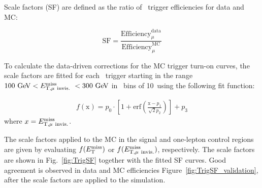 \par Scale factors (SF) are defined as the ratio of \MET~trigger efficiencies for data and MC:

\begin{equation}
	\label{eq:dataMCsf}
	\text{SF} = \frac{\text{Efficiency}^{\text{data}}_{\mu}}{\text{Efficiency}^{\text{MC}}_{\mu}}
\end{equation}

To calculate the data-driven corrections for the MC trigger turn-on curves, the scale factors are fitted for each \MET~trigger starting in the range $100~\text{Ge\kern -0.1em V} < E_{\mathrm{T, \mu~invis.}}^{\mathrm{miss}}~< 300~\text{Ge\kern -0.1em V}$ in \MET~bins of 10~\GeV using the following fit function:

\begin{eqnarray}
	\label{eq:dataMCsf_fit}
	f\left(\text{x}\right) = p_0 \cdot \left[1 + \text{erf}\left(\frac{\text{x} - p_{1}}{\sqrt{2}p_{2}}\right)\right] + p_3
\end{eqnarray}
where $x = E_{\mathrm{T, \mu~invis.}}^{\mathrm{miss}}$.

\par The scale factors applied to the MC in the signal and one-lepton control regions are given by evaluating $f(E_{\mathrm{T}}^{\mathrm{miss}})$ or $f(E_{\mathrm{T, \mu~invis.}}^{\mathrm{miss}})$, respectively. 
The scale factors are shown in Fig.~\ref{fig:TrigSF} together with the fitted SF curves.
Good agreement is observed in data and MC efficiencies Figure~\ref{fig:TrigSF_validation}, after the scale factors are applied to the simulation.


